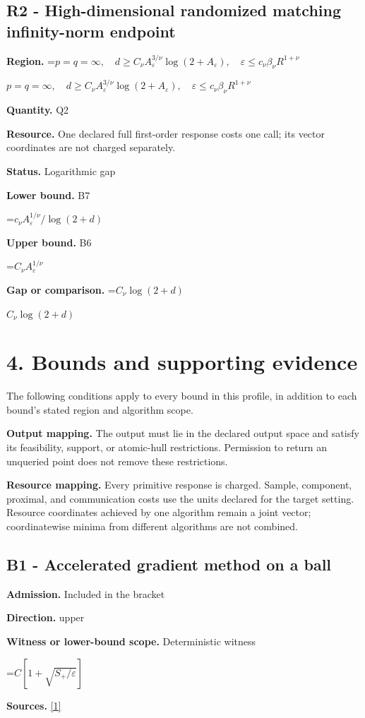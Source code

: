 \documentclass[10pt,a4paper]{article}
\newcommand{\AtlasMath}[1]{\par\begingroup\centering\setbox0=\hbox{$\displaystyle #1$}\ifdim\wd0>1.4\linewidth\typeout{ATLAS WIDE FORMULA: \the\wd0}\fi\ifdim\wd0>\linewidth\resizebox{\linewidth}{!}{\box0}\else\box0\fi\par\endgroup}
\newcommand{\AtlasInlineMath}[1]{\begingroup\setbox0=\hbox{$#1$}\ifdim\wd0>.4\linewidth\endgroup\AtlasMath{#1}\else\endgroup$#1$\fi}
\begin{document}
\subsection{R2 - High-dimensional randomized matching infinity-norm endpoint}
\textbf{Region.} \AtlasInlineMath{p=q=\infty,\quad d\ge C_\nu A_\varepsilon^{3/\nu}\log(2+A_\varepsilon),\quad\varepsilon\le c_\nu\beta_\nu R^{1+\nu}}

\textbf{Quantity.} Q2

\textbf{Resource.} One declared full first-order response costs one call; its vector coordinates are not charged separately.

\textbf{Status.} Logarithmic gap

\textbf{Lower bound.} B7

\AtlasMath{c_\nu A_\varepsilon^{1/\nu}/\log(2+d)}
\textbf{Upper bound.} B6

\AtlasMath{C_\nu A_\varepsilon^{1/\nu}}
\textbf{Gap or comparison.} \AtlasInlineMath{C_\nu\log(2+d)}

\section{4. Bounds and supporting evidence}
The following conditions apply to every bound in this profile, in addition to each bound's stated region and algorithm scope.

\textbf{Output mapping.} The output must lie in the declared output space and satisfy its feasibility, support, or atomic-hull restrictions. Permission to return an unqueried point does not remove these restrictions.

\textbf{Resource mapping.} Every primitive response is charged. Sample, component, proximal, and communication costs use the units declared for the target setting. Resource coordinates achieved by one algorithm remain a joint vector; coordinatewise minima from different algorithms are not combined.

\subsection{B1 - Accelerated gradient method on a ball}
\textbf{Admission.} Included in the bracket

\textbf{Direction.} upper

\textbf{Witness or lower-bound scope.} Deterministic witness

\AtlasMath{C[1+\sqrt{S_+/\varepsilon}]}
\textbf{Sources.} \href{https://optimization-online.org/wp-content/uploads/2010/12/2865.pdf}{[1]}
\end{document}
